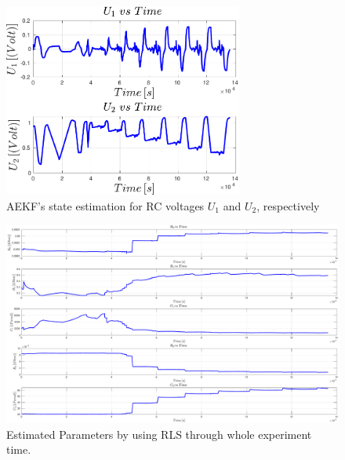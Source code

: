 \documentclass[12pt]{article}
\begin{document}
\begin{figure}[h!]
	\centering
	\includegraphics[width=0.7\textwidth, keepaspectratio]{images/AEKF_RC_Voltages.pdf}
	\caption{AEKF's state estimation for RC voltages $U_{1}$ and $U_{2}$, respectively }
	\label{fig:The_AEKF_RC_Voltages}
\end{figure}

\begin{figure}[h!]
	\centering
	\includegraphics[width=1.0\textwidth, keepaspectratio]{images/RLS_Results_With_AEKF.pdf}
	\caption{Estimated Parameters by using RLS through whole experiment time.}
	\label{fig:RLS_Results_With_AEKF}
\end{figure}


\clearpage


\clearpage
\end{document}
